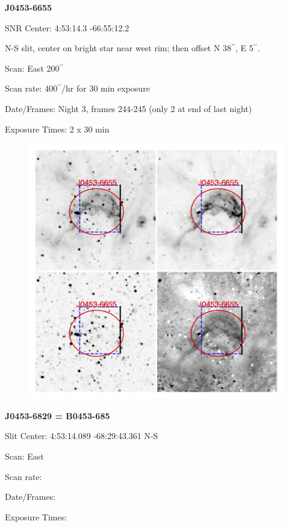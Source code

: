 \documentclass[11pt]{article}
\newcommand{\arcsec}{$^{\prime\prime}$}
\begin{document}
\newpage
{\bf J0453-6655}

SNR Center:   4:53:14.3   -66:55:12.2     

N-S slit, center on bright star near west rim; then offset N 38$^{\prime\prime}$, E 5\arcsec.

Scan:  East  200$^{\prime\prime}$

Scan rate:  400$^{\prime\prime}$/hr for 30 min exposure

Date/Frames:  Night 3, frames 244-245 (only 2 at end of last night)

Exposure Times:  2 x 30 min

\begin{figure}
\includegraphics[width=12.5cm]{snapshots/J0453-6655a.png}
\end{figure}



\newpage
{\bf J0453-6829 = B0453-685}

Slit Center:   4:53:14.089    -68:29:43.361     N-S

Scan:  East

Scan rate:  

Date/Frames:

Exposure Times:  
\end{document}
